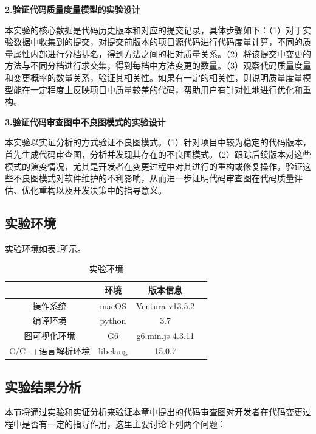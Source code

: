 \noindent \textbf{2.验证代码质量度量模型的实验设计}

本实验的核心数据是代码历史版本和对应的提交记录，具体步骤如下：（1）对于实验数据中收集到的提交，对提交前版本的项目源代码进行代码度量计算，不同的质量属性内部进行分档排名，得到方法之间的相对质量关系。（2）将该提交中变更的方法与不同分档进行求交集，得到每档中方法变更的数量。（3）观察代码质量度量和变更概率的数量关系，验证其相关性。如果有一定的相关性，则说明质量度量模型能在一定程度上反映项目中质量较差的代码，帮助用户有针对性地进行优化和重构。

\noindent \textbf{3.验证代码审查图中不良图模式的实验设计}

本实验以实证分析的方式验证不良图模式。（1）针对项目中较为稳定的代码版本，首先生成代码审查图，分析并发现其存在的不良图模式。（2）跟踪后续版本对这些模式的演变情况，尤其是开发者在变更过程中对其进行的重构或修复操作，验证这些不良图模式对软件维护的不利影响，从而进一步证明代码审查图在代码质量评估、优化重构以及开发决策中的指导意义。


\subsection{实验环境}


实验环境如表\ref{4_实验环境}所示。

\begin{table}[htbp]
\caption{实验环境}
\label{4_实验环境}
\vspace{0.5em}\centering\wuhao
\begin{tabular}{cccc}
\toprule
    & 环境 & 版本信息 \\
\midrule
操作系统 & macOS & Ventura v13.5.2  \\
编译环境 & python & 3.7   \\
图可视化环境 & G6 & g6.min.js 4.3.11  \\  
C/C++语言解析环境 & libclang & 15.0.7  \\ 
\bottomrule
\end{tabular}
\end{table}



\subsection{实验结果分析}

本节将通过实验和实证分析来验证本章中提出的代码审查图对开发者在代码变更过程中是否有一定的指导作用，这里主要讨论下列两个问题：

